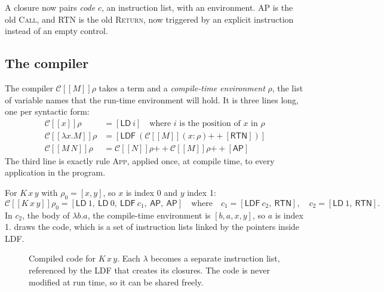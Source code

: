 \documentclass[11pt,a4paper]{article}
\newcommand{\rul}[1]{\textsc{#1}}
\newcommand{\ins}[1]{\textsf{#1}}
\newcommand{\sem}[1]{[\![#1]\!]}
\theoremstyle{definition}
\theoremstyle{plain}
\begin{document}
A closure now pairs \emph{code} $c$, an instruction list, with an environment.
\ins{AP} is the old \rul{Call}, and \ins{RTN} is the old \rul{Return}, now
triggered by an explicit instruction instead of an empty control.

\subsection{The compiler}

The compiler $\mathcal{C}\sem{M}\rho$ takes a term and a \emph{compile-time
environment} $\rho$, the list of variable names that the run-time
environment will hold. It is three lines long, one per syntactic form:
\begin{align*}
  \mathcal{C}\sem{x}\rho &= [\ins{LD}\ i] \quad\text{where $i$ is the position of $x$ in $\rho$}\\
  \mathcal{C}\sem{\lambda x.M}\rho &= [\ins{LDF}\ (\mathcal{C}\sem{M}(x : \rho) \mathbin{+\!\!+} [\ins{RTN}])]\\
  \mathcal{C}\sem{M\,N}\rho &= \mathcal{C}\sem{N}\rho \mathbin{+\!\!+} \mathcal{C}\sem{M}\rho \mathbin{+\!\!+} [\ins{AP}]
\end{align*}
The third line is exactly rule \rul{App}, applied once, at compile time, to
every application in the program.

For $K\,x\,y$ with $\rho_0 = [x, y]$, so $x$ is index 0 and $y$ index 1:
\[
  \mathcal{C}\sem{K\,x\,y}\rho_0 =
  [\ins{LD}\ 1,\ \ins{LD}\ 0,\ \ins{LDF}\ c_1,\ \ins{AP},\ \ins{AP}]
  \quad\text{where}\quad
  c_1 = [\ins{LDF}\ c_2,\ \ins{RTN}],\quad
  c_2 = [\ins{LD}\ 1,\ \ins{RTN}].
\]
In $c_2$, the body of $\lambda b.a$, the compile-time environment is
$[b, a, x, y]$, so $a$ is index 1.  draws the code, which is
a set of instruction lists linked by the pointers inside \ins{LDF}.

\begin{figure}[t]
\centering
{}
\caption{Compiled code for $K\,x\,y$. Each $\lambda$ becomes a separate
instruction list, referenced by the \ins{LDF} that creates its closures. The
code is never modified at run time, so it can be shared freely.}
\label{fig:code}
\end{figure}
\end{document}
